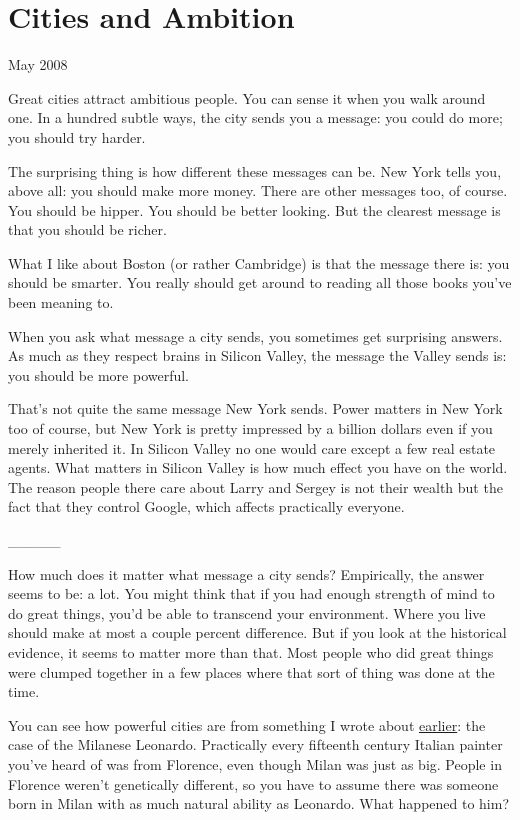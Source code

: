 \documentclass[12pt]{book}
\begin{document}
\chapter{Cities and Ambition}

May 2008

Great cities attract ambitious people. You can sense it when you walk
around one. In a hundred subtle ways, the city sends you a message: you
could do more; you should try harder.

The surprising thing is how different these messages can be. New York
tells you, above all: you should make more money. There are other
messages too, of course. You should be hipper. You should be better
looking. But the clearest message is that you should be richer.

What I like about Boston (or rather Cambridge) is that the message there
is: you should be smarter. You really should get around to reading all
those books you've been meaning to.

When you ask what message a city sends, you sometimes get surprising
answers. As much as they respect brains in Silicon Valley, the message
the Valley sends is: you should be more powerful.

That's not quite the same message New York sends. Power matters in New
York too of course, but New York is pretty impressed by a billion
dollars even if you merely inherited it. In Silicon Valley no one would
care except a few real estate agents. What matters in Silicon Valley is
how much effect you have on the world. The reason people there care
about Larry and Sergey is not their wealth but the fact that they
control Google, which affects practically everyone.

\_\_\_\_\_

How much does it matter what message a city sends? Empirically, the
answer seems to be: a lot. You might think that if you had enough
strength of mind to do great things, you'd be able to transcend your
environment. Where you live should make at most a couple percent
difference. But if you look at the historical evidence, it seems to
matter more than that. Most people who did great things were clumped
together in a few places where that sort of thing was done at the time.

You can see how powerful cities are from something I wrote about
\href{taste.html}{earlier}: the case of the Milanese Leonardo.
Practically every fifteenth century Italian painter you've heard of was
from Florence, even though Milan was just as big. People in Florence
weren't genetically different, so you have to assume there was someone
born in Milan with as much natural ability as Leonardo. What happened to
him?
\end{document}
